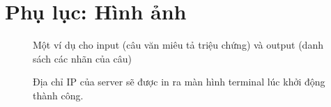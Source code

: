 \section{Phụ lục: Hình ảnh}

\begin{figure}[H]
\centering
{}
\caption{Một ví dụ cho input (câu văn miêu tả triệu chứng) và output (danh sách các nhãn của câu)}
\label{fig:example-result}
\end{figure}

\begin{figure}[H]
\centering
{}
\caption{Địa chỉ IP của server sẽ được in ra màn hình terminal lúc khởi động thành công.}
\label{fig:runserver}
\end{figure}


